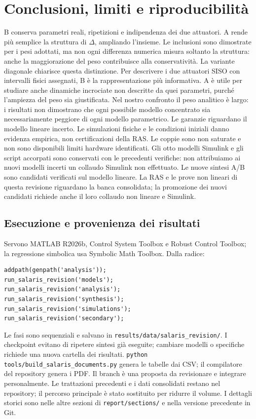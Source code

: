\chapter{Conclusioni, limiti e riproducibilità}
B conserva parametri reali, ripetizioni e indipendenza dei due attuatori.
A rende più semplice la struttura di $\Delta$, ampliando l'insieme.
Le inclusioni sono dimostrate per i pesi adottati, ma non ogni differenza
numerica misura soltanto la struttura: anche la maggiorazione del peso
contribuisce alla conservatività. La variante diagonale chiarisce questa distinzione.
Per descrivere i due attuatori SISO con intervalli fisici assegnati, B è
la rappresentazione più informativa. A è utile per studiare anche dinamiche
incrociate non descritte da quei parametri, purché l'ampiezza del peso sia
giustificata. Nel nostro confronto il peso analitico è largo: i risultati
non dimostrano che ogni possibile modello concentrato sia necessariamente
peggiore di ogni modello parametrico.
Le garanzie riguardano il modello lineare incerto. Le simulazioni fisiche
e le condizioni iniziali danno evidenza empirica, non certificazioni
della RAS. Le coppie sono non saturate e non sono disponibili limiti
hardware identificati. Gli otto modelli Simulink e gli script accorpati
sono conservati con le precedenti verifiche: non attribuiamo ai nuovi
modelli incerti un collaudo Simulink non effettuato.
Le nuove sintesi A/B sono candidati verificati sul modello lineare. La
RAS e le prove non lineari di questa revisione riguardano la banca
consolidata; la promozione dei nuovi candidati richiede anche il loro
collaudo non lineare e Simulink.
\section{Esecuzione e provenienza dei risultati}
Servono MATLAB R2026b, Control System Toolbox e Robust Control Toolbox;
la regressione simbolica usa Symbolic Math Toolbox. Dalla radice:
\begin{lstlisting}
addpath(genpath('analysis'));
run_salaris_revision('models');
run_salaris_revision('analysis');
run_salaris_revision('synthesis');
run_salaris_revision('simulations');
run_salaris_revision('secondary');
\end{lstlisting}
Le fasi sono sequenziali e salvano in
\texttt{results/data/salaris\_revision/}. I checkpoint evitano di ripetere
sintesi già eseguite; cambiare modelli o specifiche richiede una nuova
cartella dei risultati. \texttt{python tools/build\_salaris\_documents.py}
genera le tabelle dai CSV; il compilatore del repository genera i PDF.
Il branch è una proposta da revisionare e integrare personalmente.
Le trattazioni precedenti e i dati consolidati restano nel repository;
il percorso principale è stato sostituito per ridurre il volume.
I dettagli storici sono nelle altre sezioni di \texttt{report/sections/}
e nella versione precedente in Git.
